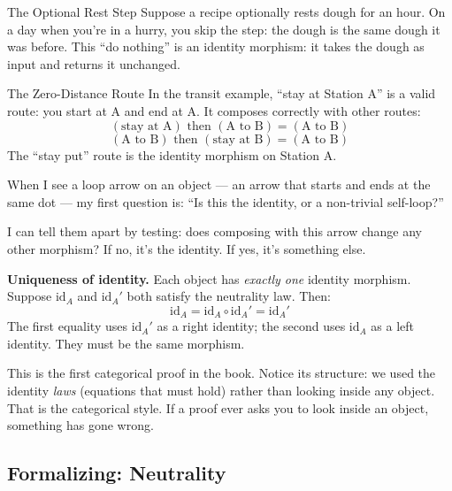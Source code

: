 \begin{example}{The Optional Rest Step}
Suppose a recipe optionally rests dough for an hour. On a day when you're in
a hurry, you skip the step: the dough is the same dough it was before.
This ``do nothing'' is an identity morphism: it takes the dough as input and
returns it unchanged.
\end{example}

\begin{example}{The Zero-Distance Route}
In the transit example, ``stay at Station A'' is a valid route: you start at A
and end at A. It composes correctly with other routes:
\[
  (\text{stay at A}) \text{ then } (\text{A to B}) = (\text{A to B})
\]
\[
  (\text{A to B}) \text{ then } (\text{stay at B}) = (\text{A to B})
\]
The ``stay put'' route is the identity morphism on Station A.
\end{example}

\begin{dialog}
When I see a loop arrow on an object --- an arrow that starts and ends at
the same dot --- my first question is: ``Is this the identity, or a
non-trivial self-loop?''

I can tell them apart by testing: does composing with this arrow change any
other morphism? If no, it's the identity. If yes, it's something else.
\end{dialog}

\textbf{Uniqueness of identity.} Each object has \emph{exactly one} identity
morphism. Suppose $\mathrm{id}_A$ and $\mathrm{id}_A'$ both satisfy the
neutrality law. Then:
\[
  \mathrm{id}_A
  = \mathrm{id}_A \circ \mathrm{id}_A'
  = \mathrm{id}_A'
\]
The first equality uses $\mathrm{id}_A'$ as a right identity; the second uses
$\mathrm{id}_A$ as a left identity. They must be the same morphism.

\begin{readernote}
This is the first categorical proof in the book. Notice its structure: we
used the identity \emph{laws} (equations that must hold) rather than looking
inside any object. That is the categorical style. If a proof ever asks you to
look inside an object, something has gone wrong.
\end{readernote}

\subsection{Formalizing: Neutrality}

